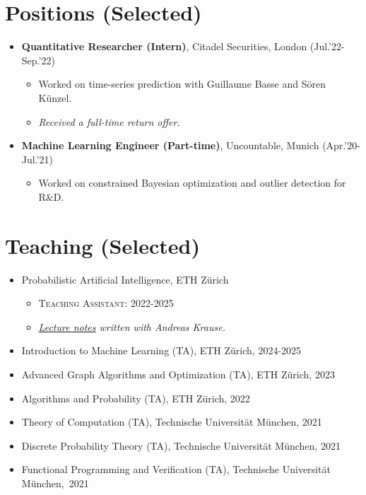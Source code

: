 \documentclass[a4paper,12pt]{article}
\begin{document}
\section*{Positions (Selected)}
\begin{itemize}[leftmargin=1.5em]
  \item \textbf{Quantitative Researcher (Intern)}, Citadel Securities, London (Jul.'22-Sep.'22) \begin{itemize}
    \item Worked on time-series prediction with Guillaume Basse and Sören Künzel.
    \item \emph{Received a full-time return offer.}
  \end{itemize}
  \item \textbf{Machine Learning Engineer (Part-time)}, Uncountable, Munich (Apr.'20-Jul.'21) \begin{itemize}
    \item Worked on constrained Bayesian optimization and outlier detection for R\&D.
  \end{itemize}
\end{itemize}

\section*{Teaching (Selected)}
\begin{itemize}[leftmargin=1.5em]
  \item {Probabilistic Artificial Intelligence}, ETH Zürich \begin{itemize}
    \item \textsc{Teaching Assistant:} 2022-2025
    \item \emph{\href{https://arxiv.org/pdf/2502.05244}{Lecture notes} written with Andreas Krause.}
  \end{itemize}
  \item {Introduction to Machine Learning (TA)}, ETH Zürich, 2024-2025
  \item {Advanced Graph Algorithms and Optimization (TA)}, ETH Zürich, 2023
  \item {Algorithms and Probability (TA)}, ETH Zürich, 2022
  \item {Theory of Computation (TA)}, Technische Universität München, 2021
  \item {Discrete Probability Theory (TA)}, Technische Universität München, 2021
  \item {Functional Programming and Verification (TA)}, Technische Universität München,~2021
\end{itemize}
\end{document}
